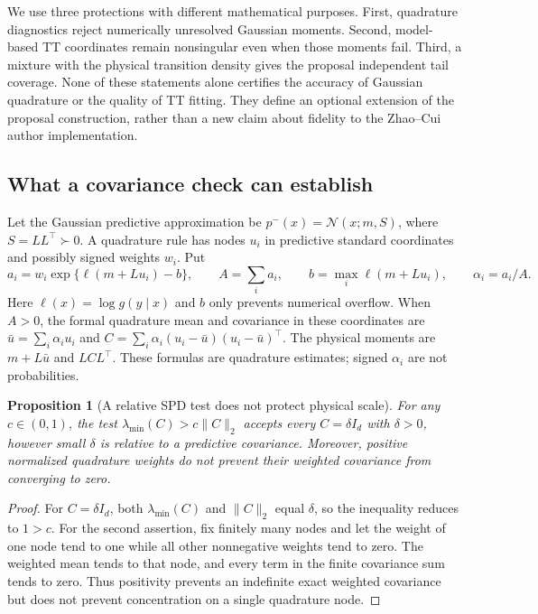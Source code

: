 \documentclass[11pt]{article}
\newtheorem{proposition}{Proposition}
\begin{document}
We use three protections with different mathematical purposes. First,
quadrature diagnostics reject numerically unresolved Gaussian moments.
Second, model-based TT coordinates remain nonsingular even when those
moments fail. Third, a mixture with the physical transition density gives
the proposal independent tail coverage. None of these statements alone
certifies the accuracy of Gaussian quadrature or the quality of TT fitting.
They define an optional extension of the proposal construction, rather than
a new claim about fidelity to the Zhao--Cui author implementation.

\subsection{What a covariance check can establish}

Let the Gaussian predictive approximation be $p^-(x)=\mathcal N(x;m,S)$,
where $S=LL^\top\succ0$. A quadrature rule has nodes $u_i$ in predictive
standard coordinates and possibly signed weights $w_i$. Put
\begin{equation}
 a_i=w_i\exp\{\ell(m+Lu_i)-b\},\qquad
 A=\sum_i a_i,\qquad b=\max_i\ell(m+Lu_i),\qquad
 \alpha_i=a_i/A .
 \label{eq:robust-signed-weights}
\end{equation}
Here $\ell(x)=\log g(y\mid x)$ and $b$ only prevents numerical overflow.
When $A>0$, the formal quadrature mean and covariance in these coordinates
are $\bar u=\sum_i\alpha_i u_i$ and
$C=\sum_i\alpha_i(u_i-\bar u)(u_i-\bar u)^\top$.
The physical moments are $m+L\bar u$ and $LCL^\top$. These formulas are
quadrature estimates; signed $\alpha_i$ are not probabilities.

\begin{proposition}[A relative SPD test does not protect physical scale]
\label{prop:robust-scale}
For any $c\in(0,1)$, the test
$\lambda_{\min}(C)>c\|C\|_2$ accepts every $C=\delta I_d$ with
$\delta>0$, however small $\delta$ is relative to a predictive covariance.
Moreover, positive normalized quadrature weights do not prevent their
weighted covariance from converging to zero.
\end{proposition}
\begin{proof}
For $C=\delta I_d$, both $\lambda_{\min}(C)$ and $\|C\|_2$ equal
$\delta$, so the inequality reduces to $1>c$. For the second assertion,
fix finitely many nodes and let the weight of one node tend to one while
all other nonnegative weights tend to zero. The weighted mean tends to that
node, and every term in the finite covariance sum tends to zero.
Thus positivity prevents an indefinite exact weighted covariance but does
not prevent concentration on a single quadrature node.
\end{proof}
\end{document}
